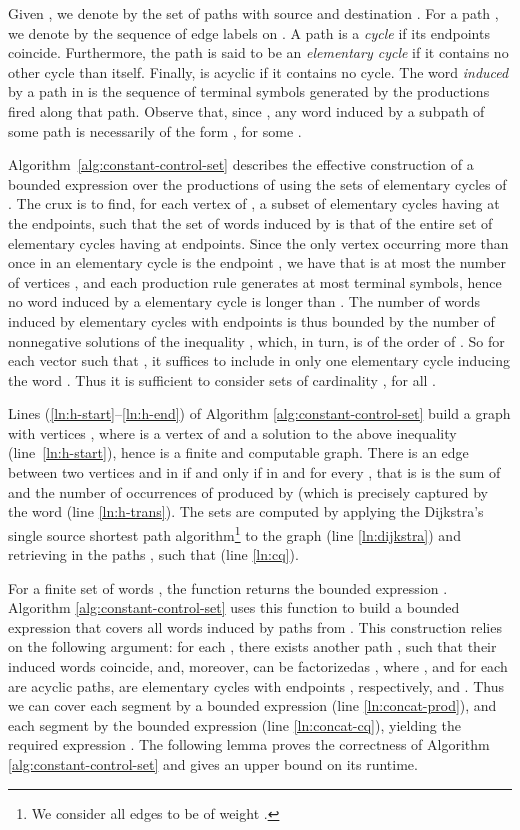 \documentclass[final]{llncs}
\begin{document}
Given , we denote by  the set of paths with
source  and destination . For a path , we denote
by  the sequence of edge labels on .
A path  is a \emph{cycle} if its endpoints coincide.
Furthermore, the path is said to be an \emph{elementary cycle} if it
contains no other cycle than itself.  Finally,  is acyclic if
it contains no cycle.  The word \emph{induced} by a path
in  is the sequence of terminal symbols generated by the
productions fired along that path. Observe that,
since , any word induced by a
subpath of some path  is
necessarily of the form , for
some .

Algorithm~\ref{alg:constant-control-set} describes the effective
construction of a bounded expression  over the productions
of  using the sets of elementary cycles of . The crux
is to find, for each vertex  of , a subset  of
elementary cycles having  at the endpoints, such that the set of
words induced by  is that of the entire set of elementary
cycles having  at endpoints. Since the only vertex occurring more
than once in an elementary cycle  is the endpoint , we
have that  is at most the number of
vertices , and each production rule generates at
most  terminal symbols, hence no word induced by a elementary cycle
is longer than . The number of
words  induced by elementary cycles
with endpoints  is thus bounded by the number of nonnegative
solutions of the inequality ,
which, in turn, is of the order of . So for
each vector  such that , it suffices to
include in  only one elementary cycle inducing the
word .
Thus it is sufficient to consider sets  of cardinality
, for all .

Lines (\ref{ln:h-start}--\ref{ln:h-end}) of Algorithm
\ref{alg:constant-control-set} build a graph 
with vertices , where 
is a vertex of  and  a solution to the
above inequality (line~\ref{ln:h-start}), hence  is a
finite and computable graph. There is an edge between two vertices
 and  in  if and only if  in
 and  for every , that is  is the
sum of  and the number of occurrences of 
produced by  (which is precisely captured by the
word  (line \ref{ln:h-trans}). The sets 
are computed by applying the Dijkstra's single source shortest path
algorithm\footnote{We consider all edges to be of weight .}  to
the graph  (line \ref{ln:dijkstra}) and retrieving
in  the paths , such that 
(line \ref{ln:cq}).

For a finite set of words , the function
 returns the bounded expression .
Algorithm \ref{alg:constant-control-set} uses this function to build a
bounded expression  that covers all words induced by paths
from . This construction relies on the
following argument: for each , there
exists another path , such that
their induced words coincide, and, moreover,  can be
factorizedas
,
where ,  and  for each  are acyclic paths,  are
elementary cycles with endpoints , respectively,
and . Thus we can cover each segment
 by a bounded expression 
(line \ref{ln:concat-prod}), and each segment  by the
bounded expression  (line \ref{ln:concat-cq}), yielding the required
expression . The following lemma proves the correctness of
Algorithm \ref{alg:constant-control-set} and gives an upper bound on its runtime.
\end{document}
